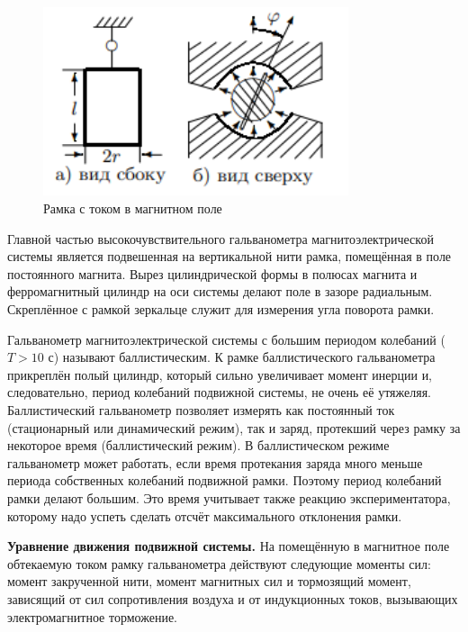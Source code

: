 \documentclass[a4paper,12pt]{article}
\begin{document}
\begin{figure}\label{fig: diod}
    \begin{center}
    \vspace{-20pt}
        \includegraphics[width = 0.8\textwidth]{рамкаВМагните.png}
    \end{center}
    \caption{Рамка с током в магнитном поле}
\end{figure}
Главной частью высокочувствительного гальванометра магнитоэлектрической
системы является подвешенная на вертикальной нити рамка, помещённая в поле
постоянного магнита. Вырез цилиндрической формы в полюсах магнита и ферромагнитный цилиндр на оси системы делают поле в зазоре радиальным. Скреплённое с рамкой зеркальце служит для измерения угла поворота рамки. 

Гальванометр магнитоэлектрической системы с большим периодом колебаний ($T > 10 \text{ с}$) называют баллистическим. К рамке баллистического гальванометра прикреплён полый цилиндр, который сильно увеличивает момент инерции и, следовательно, период колебаний подвижной системы, не очень её утяжеляя. Баллистический гальванометр позволяет измерять как постоянный ток (стационарный или динамический режим), так и заряд, протекший через рамку за некоторое время (баллистический режим). В баллистическом режиме гальванометр может работать, если время протекания заряда много меньше периода собственных колебаний подвижной рамки. Поэтому период колебаний рамки делают большим.
Это время учитывает также реакцию экспериментатора, которому надо успеть сделать отсчёт максимального отклонения рамки.

\textbf{Уравнение движения подвижной системы.} На помещённую в магнитное поле обтекаемую током рамку гальванометра действуют следующие моменты сил: момент закрученной нити, момент магнитных сил и тормозящий момент, зависящий от сил сопротивления воздуха и от индукционных токов, вызывающих электромагнитное торможение.
\end{document}
